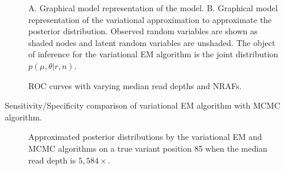 \documentclass{bmcart}
\begin{document}
\begin{backmatter}



\newpage
\begin{figure}[h!]
\begin{center}
\caption{ A. Graphical model representation of the model.
B. Graphical model representation of the variational approximation  to approximate the posterior distribution.
Observed random variables are shown as shaded nodes and latent random variables are unshaded.
The object of inference for the variational EM algorithm is the joint distribution $p(\mu, \theta|r, n)$.}
\label{figure:model}
\end{center}
\end{figure}


\begin{figure}[h!]
\centering
\caption{ROC curves with varying median read depths and NRAFs.}\label{figure:roc}
\end{figure}



\begin{table}[h!]
\caption{Sensitivity/Specificity comparison of variational EM algorithm with MCMC algorithm.}\label{table:mcmcvar}
\end{table}

\begin{figure}[h!]
\centering
\caption{Approximated posterior distributions by the variational EM and MCMC algorithms on a true variant position 85 when the median read depth is $5,584\times$.}\label{figure:compare1}
\end{figure}


\end{backmatter}
\end{document}
